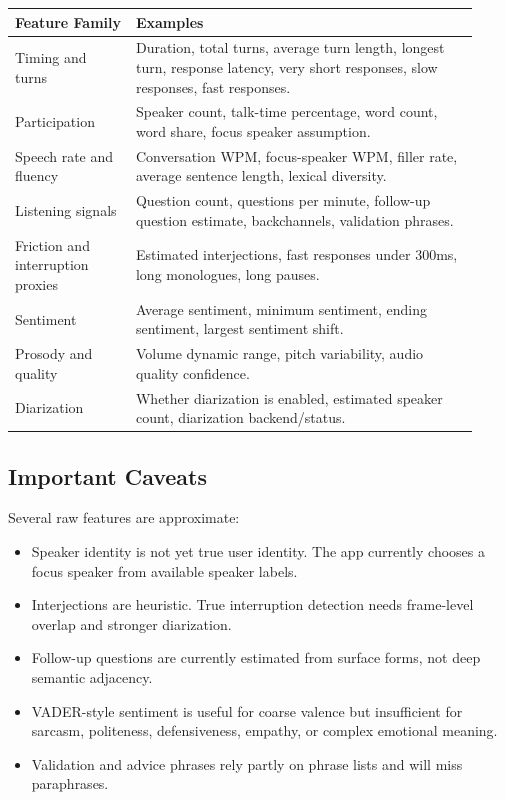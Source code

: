 \documentclass[11pt]{article}
\begin{document}
\begin{longtable}{p{0.24\linewidth}p{0.68\linewidth}}
\toprule
\textbf{Feature Family} & \textbf{Examples} \\
\midrule
Timing and turns & Duration, total turns, average turn length, longest turn, response latency, very short responses, slow responses, fast responses. \\
Participation & Speaker count, talk-time percentage, word count, word share, focus speaker assumption. \\
Speech rate and fluency & Conversation WPM, focus-speaker WPM, filler rate, average sentence length, lexical diversity. \\
Listening signals & Question count, questions per minute, follow-up question estimate, backchannels, validation phrases. \\
Friction and interruption proxies & Estimated interjections, fast responses under 300ms, long monologues, long pauses. \\
Sentiment & Average sentiment, minimum sentiment, ending sentiment, largest sentiment shift. \\
Prosody and quality & Volume dynamic range, pitch variability, audio quality confidence. \\
Diarization & Whether diarization is enabled, estimated speaker count, diarization backend/status. \\
\bottomrule
\end{longtable}

\subsection{Important Caveats}

Several raw features are approximate:

\begin{itemize}[leftmargin=*]
  \item Speaker identity is not yet true user identity. The app currently chooses a focus speaker from available speaker labels.
  \item Interjections are heuristic. True interruption detection needs frame-level overlap and stronger diarization.
  \item Follow-up questions are currently estimated from surface forms, not deep semantic adjacency.
  \item VADER-style sentiment is useful for coarse valence but insufficient for sarcasm, politeness, defensiveness, empathy, or complex emotional meaning.
  \item Validation and advice phrases rely partly on phrase lists and will miss paraphrases.
\end{itemize}
\end{document}
